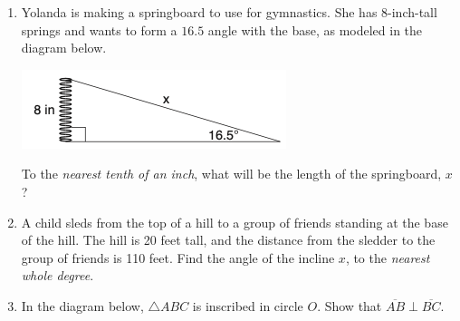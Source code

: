 \documentclass[12pt, twoside]{article}
\begin{document}
\begin{enumerate}
\item Yolanda is making a springboard to use for gymnastics. She has 8-inch-tall springs and wants to form a $16.5$ angle with the base, as modeled in the diagram below.
\begin{center}
  \includegraphics[scale=0.6]{../graphics/trig-spring.png}
\end{center}
To the \emph{nearest tenth of an inch}, what will be the length of the springboard, $x$? \vspace{4cm}

\item A child sleds from the top of a hill to a group of friends standing at the base of the hill. The hill is 20 feet tall, and the distance from the sledder to the group of friends is 110 feet. Find the angle of the incline $x$, to the \emph{nearest whole degree}.
\begin{flushright}
\end{flushright}\vspace{4cm}
  
\newpage
\item In the diagram below, $\triangle ABC$ is inscribed in circle $O$. Show that $\overline{AB} \perp \overline{BC}$.
    \begin{flushright}
    \end{flushright} \vspace{1cm}


\end{enumerate}
\end{document}
